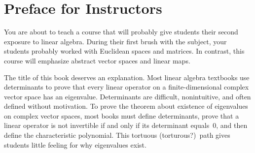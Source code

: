 \chapter{Preface for Instructors}

You are about to teach a course that will probably give students their
second exposure to linear algebra.  During their first brush with the
subject, your students probably worked with Euclidean spaces and
matrices.  In contrast, this course will emphasize abstract vector
spaces and linear maps.

The title of this book deserves an explanation.  Most linear
algebra textbooks use determinants to prove that every linear operator on a
finite-dimensional complex vector space has an eigenvalue.
Determinants are difficult, nonintuitive, and often defined without
motivation.  To prove the theorem about existence of eigenvalues on
complex vector spaces, most books must define determinants, prove that
a linear operator is not invertible if and only if its determinant
equals~$0$, and then define the characteristic polynomial.  This
tortuous (torturous?)\ path gives students little feeling for why
eigenvalues exist.

